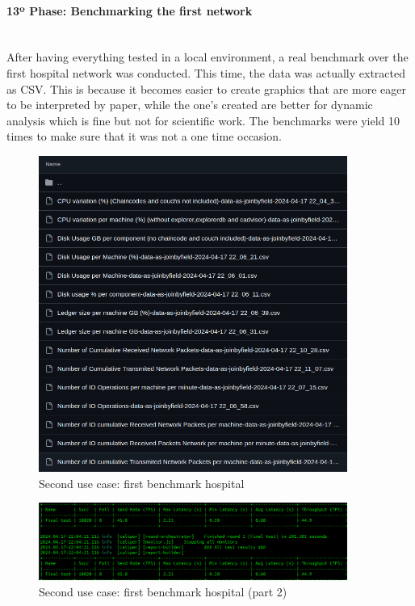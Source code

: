 \paragraph{13º Phase: Benchmarking the first network}\mbox{}\\
After having everything tested in a local environment, a real benchmark over the first hospital network was conducted. This time, the data was actually extracted as CSV. This is because it becomes easier to create graphics that are more eager to be interpreted by paper, while the one's created are better for dynamic analysis which is fine but not for scientific work. The benchmarks were yield 10 times to make sure that it was not a one time occasion.
\begin{figure}[H]
    \centering
    \includegraphics[width=0.9\textwidth]{assets/use-case-2/first-benchmarking-hospital.png} %
    \caption{Second use case: first benchmark hospital}
    \label{fig:sample-image} 
\end{figure}

\begin{figure}[H]
    \centering
    \includegraphics[width=0.9\textwidth]{assets/use-case-2/first-benchmarking-hospital2.png} %
    \caption{Second use case: first benchmark hospital (part 2)}
    \label{fig:sample-image} 
\end{figure}


